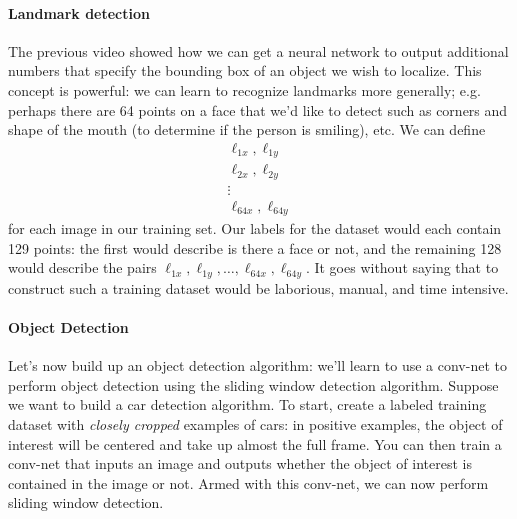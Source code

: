\documentclass[12pt]{article}
\begin{document}
\paragraph{Landmark detection} The previous video showed how we can get a neural network to output additional numbers that specify the bounding box of an object we wish to localize. This concept is powerful: we can learn to recognize landmarks more generally; e.g. perhaps there are 64 points on a face that we'd like to detect such as corners and shape of the mouth (to determine if the person is smiling), etc. We can define
\begin{align*}
  \ell_{1x}, \ell_{1y} \\
  \ell_{2x}, \ell_{2y} \\
  \vdots \\
  \ell_{64x}, \ell_{64y}
\end{align*}
for each image in our training set. Our labels for the dataset would each contain 129 points: the first would describe is there a face or not, and the remaining 128 would describe the pairs $\ell_{1x}, \ell_{1y}, \ldots, \ell_{64x}, \ell_{64y}$. It goes without saying that to construct such a training dataset would be laborious, manual, and time intensive.

\paragraph{Object Detection}
Let's now build up an object detection algorithm: we'll learn to use a conv-net to perform object detection using the sliding window detection algorithm. Suppose we want to build a car detection algorithm. To start, create a labeled
training dataset with \emph{closely cropped} examples of cars: in positive examples, the object of interest will be centered and take up almost the full frame. You can then train a conv-net that inputs an image and outputs whether the object of interest is contained in the image or not. Armed with this conv-net, we can now perform sliding window detection.
\end{document}
